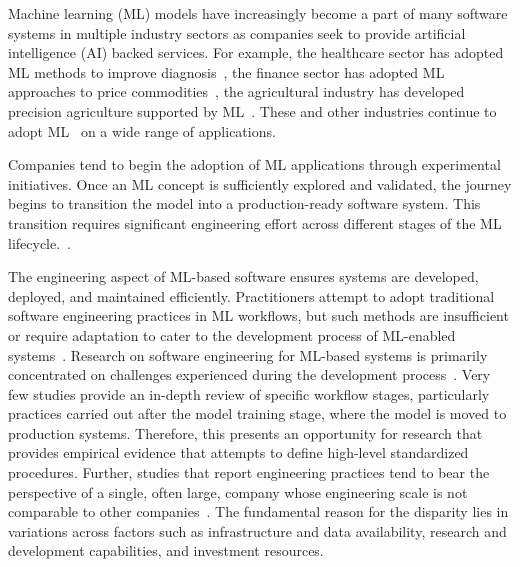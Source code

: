 Machine learning (ML) models have increasingly become a part of many software systems in multiple industry sectors as companies seek to provide artificial intelligence (AI) backed services. For example, the healthcare sector has adopted ML methods to improve diagnosis~\cite{sharma2021systematic}, the finance sector has adopted ML approaches to price commodities~\cite{ghoddusi2019machine}, the agricultural industry has developed precision agriculture supported by ML~\cite{9505674}. These and other industries continue to adopt ML~\cite{jan2022artificial} on a wide range of applications. 

Companies tend to begin the adoption of ML applications through experimental initiatives. Once an ML concept is sufficiently explored and validated, the journey begins to transition the model into a production-ready software system. This transition requires significant engineering effort across different stages of the ML lifecycle.~\cite{8498185, lwakatare2019taxonomy}.

The engineering aspect of ML-based software ensures systems are developed, deployed, and maintained efficiently. Practitioners attempt to adopt traditional software engineering practices in ML workflows, but such methods are insufficient or require adaptation to cater to the development process of ML-enabled systems~\cite{amershi2019software}.  
Research on software engineering for ML-based systems is primarily concentrated on challenges experienced during the development process~\cite{8498185, lwakatare2019taxonomy, giray2021software}. Very few studies provide an in-depth review of specific workflow stages, particularly practices carried out after the model training stage, where the model is moved to production systems. Therefore, this presents an opportunity for research that provides empirical evidence that attempts to define high-level standardized procedures. Further, studies that report engineering practices tend to bear the perspective of a single, often large, company whose engineering scale is not comparable to other companies~\cite{amershi2019software, soifer2019deep, Park}. The fundamental reason for the disparity lies in variations across factors such as infrastructure and data availability, research and development capabilities, and investment resources.


